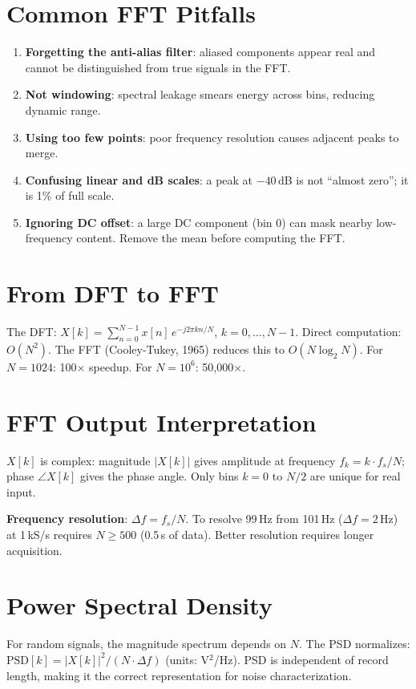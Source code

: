 \documentclass[11pt,letterpaper,twoside,openany]{book}
\begin{document}
\section{Common FFT Pitfalls}
\begin{enumerate}[leftmargin=1.5em]
\item \textbf{Forgetting the anti-alias filter}: aliased components appear real and cannot be distinguished from true signals in the FFT.
\item \textbf{Not windowing}: spectral leakage smears energy across bins, reducing dynamic range.
\item \textbf{Using too few points}: poor frequency resolution causes adjacent peaks to merge.
\item \textbf{Confusing linear and dB scales}: a peak at $-40$\,dB is not ``almost zero''; it is 1\% of full scale.
\item \textbf{Ignoring DC offset}: a large DC component (bin 0) can mask nearby low-frequency content. Remove the mean before computing the FFT.
\end{enumerate}


\section{From DFT to FFT}
The DFT: $X[k] = \sum_{n=0}^{N-1} x[n]\,e^{-j2\pi kn/N}$, $k = 0,\ldots,N-1$. Direct computation: $O(N^2)$. The FFT (Cooley-Tukey, 1965) reduces this to $O(N\log_2 N)$. For $N = 1024$: 100$\times$ speedup. For $N = 10^6$: 50,000$\times$.

\section{FFT Output Interpretation}
$X[k]$ is complex: magnitude $|X[k]|$ gives amplitude at frequency $f_k = k \cdot f_s/N$; phase $\angle X[k]$ gives the phase angle. Only bins $k = 0$ to $N/2$ are unique for real input.

\textbf{Frequency resolution}: $\Delta f = f_s/N$. To resolve 99\,Hz from 101\,Hz ($\Delta f = 2$\,Hz) at 1\,kS/s requires $N \geq 500$ (0.5\,s of data). Better resolution requires longer acquisition.

\section{Power Spectral Density}
For random signals, the magnitude spectrum depends on $N$. The PSD normalizes: $\text{PSD}[k] = |X[k]|^2/(N\cdot\Delta f)$ (units: V$^2$/Hz). PSD is independent of record length, making it the correct representation for noise characterization.
\end{document}
